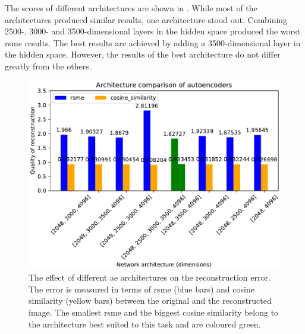 The scores of different architectures are shown in .
While most of the architectures produced similar results, one architecture stood out.
Combining 2500-, 3000- and 3500-dimensional layers in the hidden space produced the worst \ac{rsme} results.
The best results are achieved by adding a 3500-dimensional layer in the hidden space.
However, the results of the best architecture do not differ greatly from the others.

\begin{figure}[!htb] %
    \centering
    \includegraphics[width=1\textwidth]{images/embeddings/autoencoder/ae_score_plot.pdf}
    \caption[Different \ac{ae} architectures and their reconstruction error]{The effect of different \ac{ae} architectures on the reconstruction error.
    The error is measured in terms of \ac{rsme} (blue bars) and cosine similarity (yellow bars) between the original and the reconstructed image.
    The smallest \ac{rsme} and the biggest cosine similarity belong to the architecture best suited to this task and are coloured green.
    }
    \label{fig:eval-ae-architecture}
\end{figure}